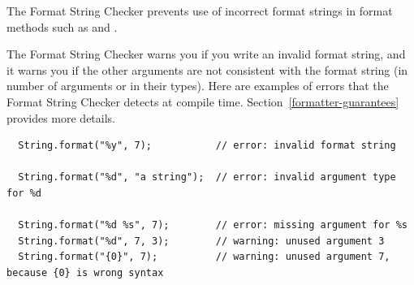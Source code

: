
\begin{sloppypar}
The Format String Checker
prevents use of incorrect format strings
in format methods such as
and .
\end{sloppypar}

The Format String Checker warns you if you write an invalid format string,
and it warns you if the other arguments are not consistent with the format
string (in number of arguments or in their types).
Here are examples of errors that the
Format String Checker
detects at compile time.
Section~\ref{formatter-guarantees} provides more details.



%
%

\begin{Verbatim}
  String.format("%y", 7);           // error: invalid format string

  String.format("%d", "a string");  // error: invalid argument type for %d

  String.format("%d %s", 7);        // error: missing argument for %s
  String.format("%d", 7, 3);        // warning: unused argument 3
  String.format("{0}", 7);          // warning: unused argument 7, because {0} is wrong syntax
\end{Verbatim}


